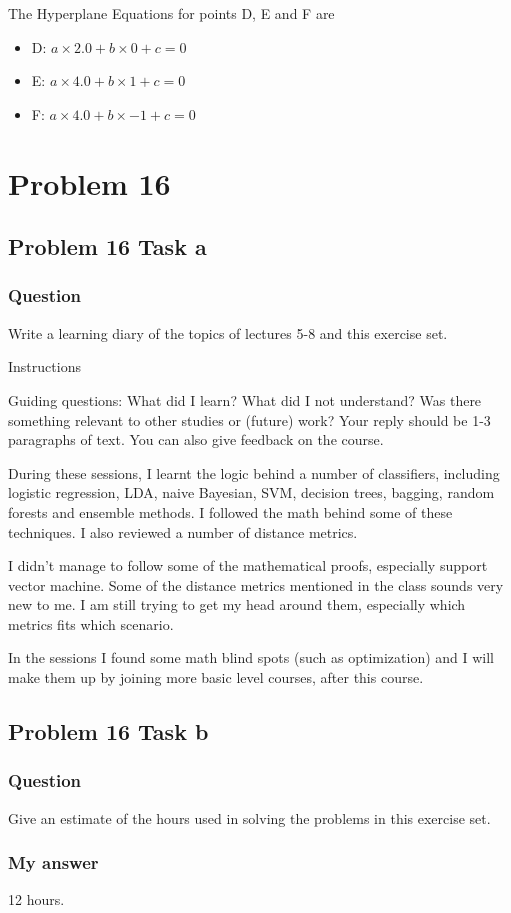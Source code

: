 \documentclass[
]{article}
\begin{document}
The Hyperplane Equations for points D, E and F are

\begin{itemize}
\item
  D: \(a \times 2.0 + b \times 0 + c = 0\)
\item
  E: \(a \times 4.0 + b \times 1 + c = 0\)
\item
  F: \(a \times 4.0 + b \times -1 + c = 0\)
\end{itemize}

\hypertarget{problem-16}{%
\section{Problem 16}\label{problem-16}}

\hypertarget{problem-16-task-a}{%
\subsection{Problem 16 Task a}\label{problem-16-task-a}}

\hypertarget{question-13}{%
\subsubsection{Question}\label{question-13}}

Write a learning diary of the topics of lectures 5-8 and this exercise
set.

Instructions

Guiding questions: What did I learn? What did I not understand? Was
there something relevant to other studies or (future) work? Your reply
should be 1-3 paragraphs of text. You can also give feedback on the
course.

During these sessions, I learnt the logic behind a number of
classifiers, including logistic regression, LDA, naive Bayesian, SVM,
decision trees, bagging, random forests and ensemble methods. I followed
the math behind some of these techniques. I also reviewed a number of
distance metrics.

I didn't manage to follow some of the mathematical proofs, especially
support vector machine. Some of the distance metrics mentioned in the
class sounds very new to me. I am still trying to get my head around
them, especially which metrics fits which scenario.

In the sessions I found some math blind spots (such as optimization) and
I will make them up by joining more basic level courses, after this
course.

\hypertarget{problem-16-task-b}{%
\subsection{Problem 16 Task b}\label{problem-16-task-b}}

\hypertarget{question-14}{%
\subsubsection{Question}\label{question-14}}

Give an estimate of the hours used in solving the problems in this
exercise set.

\hypertarget{my-answer-13}{%
\subsubsection{My answer}\label{my-answer-13}}

12 hours.
\end{document}
